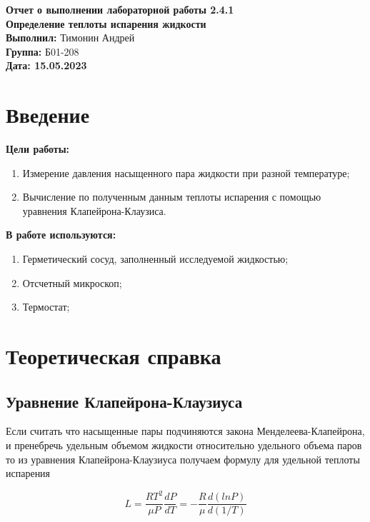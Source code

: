 \documentclass[a4paper, 12pt]{article}
\begin{document}
	\begin{Huge}
		\begin{center}
			\textbf{Отчет о выполнении лабораторной работы 2.4.1}\\
			\vspace{2em}
			\textbf{Определение теплоты испарения жидкости}\\
			\vspace{5em}
			\textbf{Выполнил: }Тимонин Андрей\\
			\textbf{Группа: }Б01-208\\
			\vspace{9em}
			\textbf{Дата: 15.05.2023}\\
		\end{center}
	\end{Huge}
	
	\section{Введение}
	\noindent\textbf{Цели работы:}	
	\begin{enumerate}
		\item Измерение давления насыщенного пара жидкости при разной температуре;
		\item Вычисление по полученным данным теплоты испарения с помощью уравнения Клапейрона-Клаузиса.
	\end{enumerate}
	\bigskip
	
	\noindent\textbf{В работе используются:}
	\begin{enumerate}
		\item Герметический сосуд, заполненный исследуемой жидкостью;
		\item Отсчетный микроскоп;
		\item Термостат;
	\end{enumerate}
	\section{Теоретическая справка}
	\subsection{Уравнение Клапейрона-Клаузиуса}
	Если считать что насыщенные пары подчиняются закона Менделеева-Клапейрона, и пренебречь удельным объемом жидкости относительно удельного объема паров то из уравнения Клапейрона-Клаузиуса получаем формулу для удельной теплоты испарения
	
	\begin{equation}\label{L}
		L = \frac{RT^2}{\mu P}\frac{dP}{dT} = - \frac{R}{\mu} \frac{d(ln P)}{d(1/T)}
	\end{equation}
	
\end{document}
